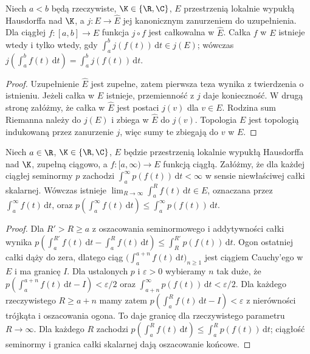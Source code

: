\begin{stwierdzenie}
\label{prop:completion-integral15a}
Niech $a<b$ będą rzeczywiste, $\K\in\{\R,\C\}$,
$E$ przestrzenią lokalnie wypukłą Hausdorffa nad $\K$,
a $j:E\to\widehat E$ jej kanonicznym zanurzeniem do uzupełnienia.
Dla ciągłej $f:[a,b]\to E$ funkcja $j\circ f$ jest
całkowalna w $\widehat E$. Całka $f$ w $E$ istnieje wtedy
i tylko wtedy, gdy $\int_a^b j(f(t))\,\mathrm dt\in j(E)$;
wówczas $j(\int_a^b f(t)\,\mathrm dt)
=\int_a^b j(f(t))\,\mathrm dt$.
\end{stwierdzenie}
\begin{proof}
Uzupełnienie $\widehat E$ jest zupełne, zatem pierwsza teza
wynika z twierdzenia o istnieniu. Jeżeli całka w $E$ istnieje,
przemienność z $j$ daje konieczność. W drugą stronę załóżmy,
że całka w $\widehat E$ jest postaci $j(v)$ dla $v\in E$.
Rodzina sum Riemanna należy do $j(E)$ i zbiega w $\widehat E$
do $j(v)$. Topologia $E$ jest topologią indukowaną przez
zanurzenie $j$, więc sumy te zbiegają do $v$ w $E$.
\end{proof}

\begin{twierdzenie}
\label{thm:improper-lcs15a}
Niech $a\in\R$, $\K\in\{\R,\C\}$, $E$ będzie przestrzenią
lokalnie wypukłą Hausdorffa nad $\K$, zupełną ciągowo,
a $f:[a,\infty)\to E$ funkcją ciągłą.
Załóżmy, że dla każdej ciągłej seminormy $p$ zachodzi
$\int_a^\infty p(f(t))\,\mathrm dt<\infty$ w sensie
niewłaściwej całki skalarnej. Wówczas istnieje
$\lim_{R\to\infty}\int_a^R f(t)\,\mathrm dt\in E$, oznaczana przez
$\int_a^\infty f(t)\,\mathrm dt$, oraz
$p(\int_a^\infty f(t)\,\mathrm dt)
\le\int_a^\infty p(f(t))\,\mathrm dt$.
\end{twierdzenie}
\begin{proof}
Dla $R'>R\ge a$ z oszacowania seminormowego i addytywności
całki wynika
$p(\int_a^{R'}f(t)\,\mathrm dt-\int_a^R f(t)\,\mathrm dt)
\le\int_R^{R'}p(f(t))\,\mathrm dt$.
Ogon ostatniej całki dąży do zera, dlatego ciąg
$\bigl(\int_a^{a+n}f(t)\,\mathrm dt\bigr)_{n\ge1}$
jest ciągiem Cauchy'ego w $E$ i ma granicę $I$.
Dla ustalonych $p$ i $\varepsilon>0$ wybieramy $n$ tak duże,
że $p(\int_a^{a+n}f(t)\,\mathrm dt-I)<\varepsilon/2$
oraz $\int_{a+n}^\infty p(f(t))\,\mathrm dt<\varepsilon/2$.
Dla każdego rzeczywistego $R\ge a+n$ mamy zatem
$p(\int_a^R f(t)\,\mathrm dt-I)<\varepsilon$ z nierówności
trójkąta i oszacowania ogona. To daje granicę dla rzeczywistego
parametru $R\to\infty$. Dla każdego $R$ zachodzi
$p(\int_a^R f(t)\,\mathrm dt)\le\int_a^R p(f(t))\,\mathrm dt$;
ciągłość seminormy i granica całki skalarnej dają oszacowanie końcowe.
\end{proof}


